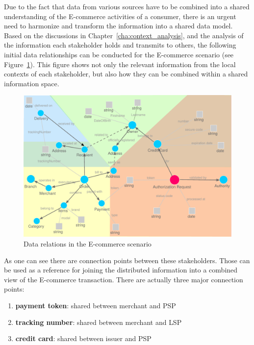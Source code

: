 Due to the fact that data from various sources have to be combined into a shared understanding of the \gls{E-commerce} activities of a consumer, there is an urgent need to harmonize and transform the information into a shared data model. Based on the discussions in Chapter~\ref{cha:context_analysis}, and the analysis of the information each stakeholder holds and transmits to others, the following initial data relationships can be conducted for the \gls{E-commerce} scenario (see Figure~\ref{fig:images_data_model}). This figure shows not only the relevant information from the local contexts of each stakeholder, but also how they can be combined within a shared information space. \\

\begin{figure}[!ht]
  \centering
  \includegraphics[width=0.9\columnwidth]{images/ontology_scenario_1.pdf}
  \caption{Data relations in the \gls{E-commerce} scenario\protect\footnotemark}
\label{fig:images_data_model}
\end{figure}

As one can see there are connection points between these stakeholders. Those can be used as a reference for joining the distributed information into a combined view of the \gls{E-commerce} transaction. There are actually three major connection points: \@

\begin{enumerate}
  \item \textbf{payment token}: shared between merchant and \gls{PSP}
  \item \textbf{tracking number}: shared between merchant and \gls{LSP}
  \item \textbf{credit card}: shared between issuer and \gls{PSP}
\end{enumerate}

